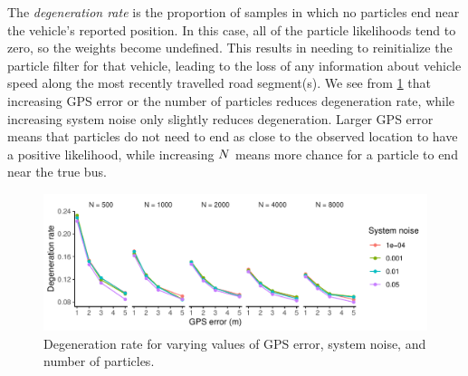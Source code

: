 The \emph{degeneration rate} is the proportion of samples in which no particles end near the vehicle's reported position. In this case, all of the particle likelihoods tend to zero, so the weights become undefined. This results in needing to reinitialize the particle filter for that vehicle, leading to the loss of any information about vehicle speed along the most recently travelled road segment(s). We see from \cref{fig:model_performance_degen} that increasing GPS error or the number of particles reduces degeneration rate, while increasing system noise only slightly reduces degeneration. Larger GPS error means that particles do not need to end as close to the observed location to have a positive likelihood, while increasing $N$ means more chance for a particle to end near the true bus.

\begin{knitrout}\small
{}\color{fgcolor}\begin{figure}

{\centering \includegraphics[width=\textwidth]{figure/model_performance_degen-1} 

}

\caption[Degeneration rate for varying values of GPS error, system noise, and number of particles]{Degeneration rate for varying values of GPS error, system noise, and number of particles.}\label{fig:model_performance_degen}
\end{figure}


\end{knitrout}

